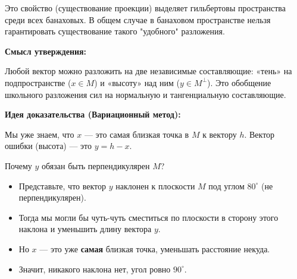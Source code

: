 \begin{remark}
	Это свойство (существование проекции) выделяет гильбертовы пространства среди всех банаховых. В общем случае в банаховом пространстве нельзя гарантировать существование такого "удобного" разложения.
\end{remark}

\begin{idea}
	
	\textbf{Смысл утверждения:}
	
	Любой вектор можно разложить на две независимые составляющие: «тень» на подпространстве ($x \in M$) и «высоту» над ним ($y \in M^\perp$). Это обобщение школьного разложения сил на нормальную и тангенциальную составляющие.
	
	\textbf{Идея доказательства (Вариационный метод):}
	
	Мы уже знаем, что $x$ — это самая близкая точка в $M$ к вектору $h$. Вектор ошибки (высота) — это $y = h - x$.
	
	Почему $y$ обязан быть перпендикулярен $M$?
	
	\begin{itemize}
		
		\item Представьте, что вектор $y$ наклонен к плоскости $M$ под углом $80^\circ$ (не перпендикулярен).
		
		\item Тогда мы могли бы чуть-чуть сместиться по плоскости в сторону этого наклона и уменьшить длину вектора $y$.
		
		\item Но $x$ — это уже \textbf{самая} близкая точка, уменьшать расстояние некуда.
		
		\item Значит, никакого наклона нет, угол ровно $90^\circ$.
		
	\end{itemize}
	
\end{idea}